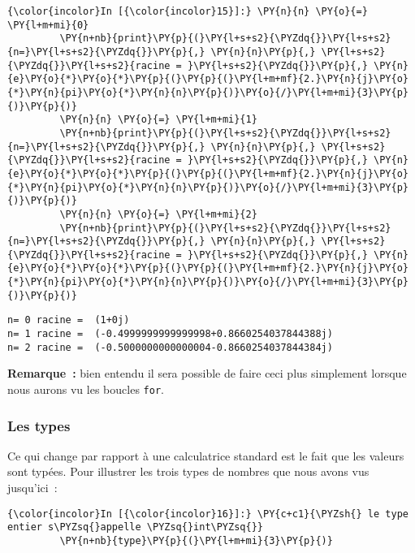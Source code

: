     \begin{Verbatim}[commandchars=\\\{\},frame=single,framerule=0.3mm,rulecolor=\color{cellframecolor}]
{\color{incolor}In [{\color{incolor}15}]:} \PY{n}{n} \PY{o}{=} \PY{l+m+mi}{0}
         \PY{n+nb}{print}\PY{p}{(}\PY{l+s+s2}{\PYZdq{}}\PY{l+s+s2}{n=}\PY{l+s+s2}{\PYZdq{}}\PY{p}{,} \PY{n}{n}\PY{p}{,} \PY{l+s+s2}{\PYZdq{}}\PY{l+s+s2}{racine = }\PY{l+s+s2}{\PYZdq{}}\PY{p}{,} \PY{n}{e}\PY{o}{*}\PY{o}{*}\PY{p}{(}\PY{p}{(}\PY{l+m+mf}{2.}\PY{n}{j}\PY{o}{*}\PY{n}{pi}\PY{o}{*}\PY{n}{n}\PY{p}{)}\PY{o}{/}\PY{l+m+mi}{3}\PY{p}{)}\PY{p}{)}
         \PY{n}{n} \PY{o}{=} \PY{l+m+mi}{1}
         \PY{n+nb}{print}\PY{p}{(}\PY{l+s+s2}{\PYZdq{}}\PY{l+s+s2}{n=}\PY{l+s+s2}{\PYZdq{}}\PY{p}{,} \PY{n}{n}\PY{p}{,} \PY{l+s+s2}{\PYZdq{}}\PY{l+s+s2}{racine = }\PY{l+s+s2}{\PYZdq{}}\PY{p}{,} \PY{n}{e}\PY{o}{*}\PY{o}{*}\PY{p}{(}\PY{p}{(}\PY{l+m+mf}{2.}\PY{n}{j}\PY{o}{*}\PY{n}{pi}\PY{o}{*}\PY{n}{n}\PY{p}{)}\PY{o}{/}\PY{l+m+mi}{3}\PY{p}{)}\PY{p}{)}
         \PY{n}{n} \PY{o}{=} \PY{l+m+mi}{2}
         \PY{n+nb}{print}\PY{p}{(}\PY{l+s+s2}{\PYZdq{}}\PY{l+s+s2}{n=}\PY{l+s+s2}{\PYZdq{}}\PY{p}{,} \PY{n}{n}\PY{p}{,} \PY{l+s+s2}{\PYZdq{}}\PY{l+s+s2}{racine = }\PY{l+s+s2}{\PYZdq{}}\PY{p}{,} \PY{n}{e}\PY{o}{*}\PY{o}{*}\PY{p}{(}\PY{p}{(}\PY{l+m+mf}{2.}\PY{n}{j}\PY{o}{*}\PY{n}{pi}\PY{o}{*}\PY{n}{n}\PY{p}{)}\PY{o}{/}\PY{l+m+mi}{3}\PY{p}{)}\PY{p}{)}
\end{Verbatim}


    \begin{Verbatim}[commandchars=\\\{\},frame=single,framerule=0.3mm,rulecolor=\color{cellframecolor}]
n= 0 racine =  (1+0j)
n= 1 racine =  (-0.4999999999999998+0.8660254037844388j)
n= 2 racine =  (-0.5000000000000004-0.8660254037844384j)
\end{Verbatim}

    \textbf{Remarque~:} bien entendu il sera possible de faire ceci plus
simplement lorsque nous aurons vu les boucles \texttt{for}.

    \hypertarget{les-types}{%
\subsubsection{Les types}\label{les-types}}

    Ce qui change par rapport à une calculatrice standard est le fait que
les valeurs sont typées. Pour illustrer les trois types de nombres que
nous avons vus jusqu'ici~:

    \begin{Verbatim}[commandchars=\\\{\},frame=single,framerule=0.3mm,rulecolor=\color{cellframecolor}]
{\color{incolor}In [{\color{incolor}16}]:} \PY{c+c1}{\PYZsh{} le type entier s\PYZsq{}appelle \PYZsq{}int\PYZsq{}}
         \PY{n+nb}{type}\PY{p}{(}\PY{l+m+mi}{3}\PY{p}{)}
\end{Verbatim}


